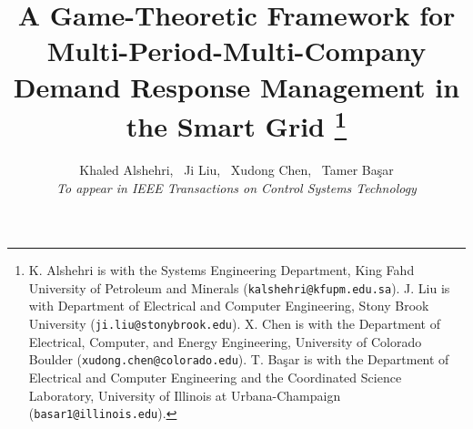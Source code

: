 \documentclass[10 pt, journal]{IEEEtran}
\begin{document}
\title{{\color{black}A Game-Theoretic Framework for Multi-Period-Multi-Company Demand Response
 Management in the Smart Grid
} \thanks{K. Alshehri is with the Systems Engineering Department, King Fahd University of Petroleum and Minerals (\texttt{kalshehri@kfupm.edu.sa}). J. Liu is with Department of Electrical and Computer Engineering, Stony Brook University
(\texttt{ji.liu@stonybrook.edu}). X. Chen is with the Department of Electrical, Computer, and Energy Engineering, University of Colorado Boulder  (\texttt{xudong.chen@colorado.edu}). T. Ba\c{s}ar is with the Department of Electrical and Computer Engineering and the Coordinated Science Laboratory, University of Illinois at Urbana-Champaign (\texttt{basar1@illinois.edu}). }
}




\author{Khaled Alshehri, ~Ji Liu, ~Xudong Chen, ~Tamer Ba\c sar\\
{\it{\color{red}To appear in IEEE Transactions on Control Systems Technology}}
}



\maketitle
\thispagestyle{empty}
\pagestyle{empty}
\end{document}
